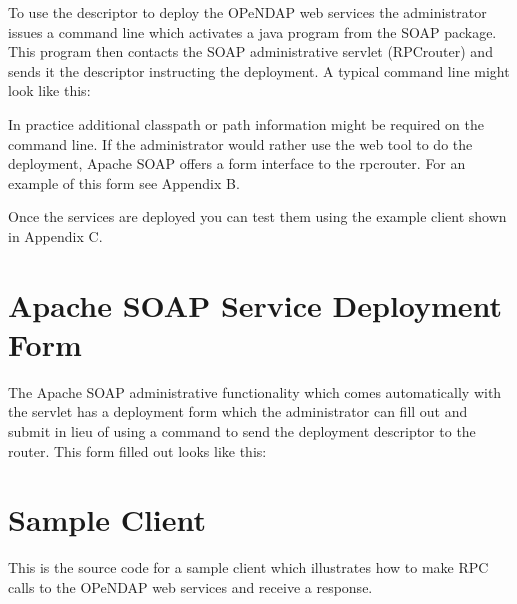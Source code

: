 \documentclass[justify]{dods-paper}
\begin{document}
To use the descriptor to deploy the OPeNDAP web services the administrator issues a command line which activates a java program from the SOAP package. This program then contacts the SOAP administrative servlet (RPCrouter) and sends it the descriptor instructing the deployment. A typical command line might look like this:


In practice additional classpath or path information might be required on the command line. If the administrator would rather use the web tool to do the deployment, Apache SOAP offers a form interface to the rpcrouter. For an example of this form see Appendix B.

Once the services are deployed you can test them using the example client shown in Appendix C. 


\section{Apache SOAP Service Deployment Form}

The Apache SOAP administrative functionality which comes automatically with the servlet has a deployment form which the administrator can fill out and submit in lieu of using a command to send the deployment descriptor to the router. This form filled out looks like this:


\section{Sample Client}

This is the source code for a sample client which illustrates how to make RPC calls to the OPeNDAP web services and receive a response.
\end{document}
